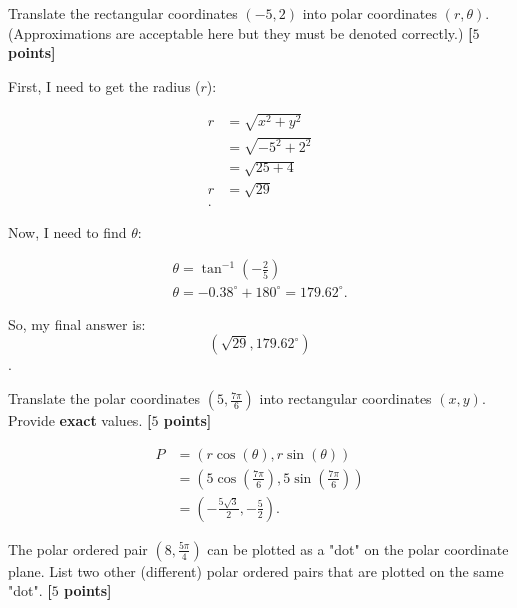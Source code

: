 \begin{problem}
  Translate the rectangular coordinates $(-5, 2)$ into polar coordinates $(r,
  \theta)$. (Approximations are acceptable here but they must be denoted
  correctly.) \textbf{[$5$ points]}
\end{problem}

\begin{solution}
  First, I need to get the radius ($r$):

  \begin{align*}
    r &= \sqrt{x^{2} + y^{2}} \\
      &= \sqrt{-5^{2} + 2^{2}} \\
      &= \sqrt{25 + 4} \\
    r &= \sqrt{29} \\
  .\end{align*}

  Now, I need to find $\theta$:

  \begin{align*}
    \theta = \tan^{-1} \left(-\frac{2}{5}\right) \\
    \theta = -0.38^{\circ} + 180^{\circ} = 179.62^{\circ}
  .\end{align*}

  So, my final answer is:
  \[ (\sqrt{29}, 179.62^{\circ}) \].
\end{solution}

\newpage

\begin{problem}
  Translate the polar coordinates $(5, \frac{7\pi}{6})$ into rectangular
  coordinates $(x,y )$. Provide \textbf{exact} values. \textbf{[$5$ points]}
\end{problem}

\begin{solution}
  \begin{align*}
    P &= (r\cos (\theta), r\sin (\theta)) \\
      &= (5\cos \left(\frac{7\pi}{6}\right), 5\sin \left(\frac{7\pi}{6}\right)) \\
      &= \left(-\frac{5\sqrt{3}}{2}, -\frac{5}{2}\right)
  .\end{align*}
\end{solution}

\newpage

\begin{problem}
  The polar ordered pair $(8, \frac{5\pi}{4})$ can be plotted as a "dot" on the
  polar coordinate plane. List two other (different) polar ordered pairs that
  are plotted on the same "dot". \textbf{[$5$ points]}
\end{problem}

